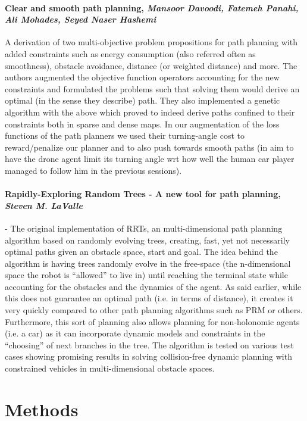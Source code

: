\documentclass[a4paper,11pt]{article}
\begin{document}
\paragraph{Clear and smooth path planning, \textit{Mansoor Davoodi, Fatemeh Panahi, Ali Mohades, Seyed Naser Hashemi}} \cite{davoodi2015clear}
A derivation of two multi-objective problem propositions for path planning with added constraints such as energy consumption (also referred often as smoothness), obstacle avoidance, distance (or weighted distance) and more. The authors augmented the objective function operators accounting for the new constraints and formulated the problems such that solving them would derive an optimal (in the sense they describe) path. They also implemented a genetic algorithm with the above which proved to indeed derive paths confined to their constraints both in sparse and dense maps. In our augmentation of the loss functions of the path planners we used  their turning-angle cost to reward/penalize our planner and to also push towards smooth paths (in aim to have the drone agent limit its turning angle wrt how well the human car player managed to follow him in the previous sessions).

\paragraph{Rapidly-Exploring Random Trees - A new tool for path planning, \textit{Steven M. LaValle}} \cite{lavalle1998rapidly} - The original implementation of RRTs, an multi-dimensional path planning algorithm based on randomly evolving trees, creating, fast, yet not necessarily optimal paths given an obstacle space, start and goal. The idea behind the algorithm is having trees randomly evolve in the free-space (the n-dimensional space the robot is “allowed” to live in) until reaching the terminal state while accounting for the obstacles and the dynamics of the agent. As said earlier, while this does not guarantee an optimal path (i.e. in terms of distance), it creates it very quickly compared to other path planning algorithms such as PRM or others. Furthermore, this sort of planning also allows planning for non-holonomic agents (i.e. a car) as it can incorporate dynamic models and constraints in the “choosing” of next branches in the tree. The algorithm is tested on various test cases showing promising results in solving collision-free dynamic planning with constrained vehicles in multi-dimensional obstacle spaces.


\newpage
\section{Methods}
\end{document}
